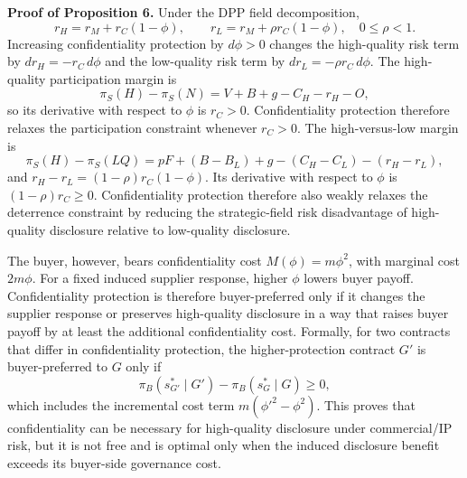 \documentclass[final,5p,times,authoryear]{elsarticle}
\begin{document}
\textbf{Proof of Proposition 6.} Under the DPP field decomposition,
\[
r_H=r_M+r_C(1-\phi),\qquad r_L=r_M+\rho r_C(1-\phi),\quad 0\leq\rho<1.
\]
Increasing confidentiality protection by $d\phi>0$ changes the high-quality risk term by $dr_H=-r_C\,d\phi$ and the low-quality risk term by $dr_L=-\rho r_C\,d\phi$. The high-quality participation margin is
\[
\pi_S(H)-\pi_S(N)=V+B+g-C_H-r_H-O,
\]
so its derivative with respect to $\phi$ is $r_C>0$. Confidentiality protection therefore relaxes the participation constraint whenever $r_C>0$. The high-versus-low margin is
\[
\pi_S(H)-\pi_S(LQ)=pF+(B-B_L)+g-(C_H-C_L)-(r_H-r_L),
\]
and $r_H-r_L=(1-\rho)r_C(1-\phi)$. Its derivative with respect to $\phi$ is $(1-\rho)r_C\geq0$. Confidentiality protection therefore also weakly relaxes the deterrence constraint by reducing the strategic-field risk disadvantage of high-quality disclosure relative to low-quality disclosure.

The buyer, however, bears confidentiality cost $M(\phi)=m\phi^2$, with marginal cost $2m\phi$. For a fixed induced supplier response, higher $\phi$ lowers buyer payoff. Confidentiality protection is therefore buyer-preferred only if it changes the supplier response or preserves high-quality disclosure in a way that raises buyer payoff by at least the additional confidentiality cost. Formally, for two contracts that differ in confidentiality protection, the higher-protection contract $G'$ is buyer-preferred to $G$ only if
\[
\pi_B(s_{G'}^*\mid G')-\pi_B(s_G^*\mid G)\geq 0,
\]
which includes the incremental cost term $m(\phi'^2-\phi^2)$. This proves that confidentiality can be necessary for high-quality disclosure under commercial/IP risk, but it is not free and is optimal only when the induced disclosure benefit exceeds its buyer-side governance cost.



\end{document}
